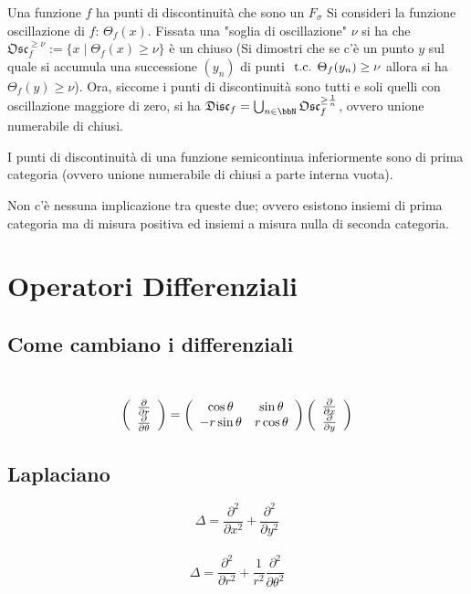 \documentclass[a4paper,NoNotes,GeneralMath]{stdmdoc}
\newcommand{\disc}{\mathfrak{Disc}}
\newcommand{\osc}{\mathfrak{Osc}}
\newcommand{\depolar}{\left( \begin{array}{c} \dpar{}{r} \\ \dpar{}{\theta} \end{array} \right)}
\newcommand{\decart}{\left( \begin{array}{c} \dpar{}{x} \\ \dpar{}{y} \end{array} \right)}
\begin{document}
 Una funzione $f$ ha punti di discontinuità che sono un $F_\sigma$
\Dimostrazione Si consideri la funzione oscillazione di $f$: $\Theta_f(x)$. Fissata una "soglia di oscillazione" $\nu$ si ha che $\osc_f^{\ge \nu} := \{x \mid \Theta_f(x) \ge \nu\}$ è un chiuso (Si dimostri che se c'è un punto $y$ sul quale si accumula una successione $(y_n)$ di punti $\mbox{ t.c. } \Theta_f(y_n) \ge \nu$ allora si ha $\Theta_f(y) \ge \nu$). Ora, siccome i punti di discontinuità sono tutti e soli quelli con oscillazione maggiore di zero, si ha $\disc_f = \bigcup_{n\in\bbN} \osc_f^{\ge \frac{1}{n}}$, ovvero unione numerabile di chiusi.

 I punti di discontinuità di una funzione semicontinua inferiormente sono di prima categoria (ovvero unione numerabile di chiusi a parte interna vuota).

 Non c'è nessuna implicazione tra queste due; ovvero esistono insiemi di prima categoria ma di misura positiva ed insiemi a misura nulla di seconda categoria.

\section*{Operatori Differenziali}
\subsection*{Come cambiano i differenziali}
	 \\
	$$ \depolar = \left( \begin{array}{cc} \cos\theta & \sin\theta \\ -r \sin\theta & r \cos\theta \end{array} \right) \decart $$

\subsection*{Laplaciano}
	$$ \Delta = \frac{\partial^2}{\partial x^2} + \frac{\partial^2}{\partial y^2} $$ \\
	$$ \Delta = \frac{\partial^2}{\partial r^2} + \frac{1}{r^2}\frac{\partial^2}{\partial \theta^2} $$ \\
	
\end{document}

